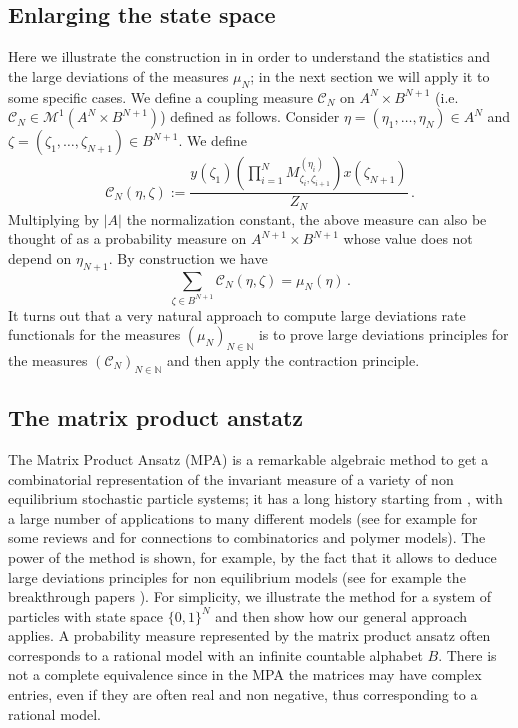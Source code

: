 \documentclass[reqno]{amsart}
\theoremstyle{plain}
\theoremstyle{definition}
\theoremstyle{remark}
\numberwithin{equation}{section}
\numberwithin{theorem}{section}
\newcommand{\<}{\langle}
\renewcommand{\>}{\rangle}
\begin{document}
	\subsection{Enlarging the state space}
	Here we illustrate the construction in \cite{GI1} in order to understand the statistics and the large deviations of the measures $\mu_N$; in the next section we will apply it to some specific cases. We define a coupling  measure $\mathcal C_N$ on $A^N\times {B}^{N+1}$ (i.e. $\mathcal C_N\in \mathcal M^1(A^N\times{B}^{N+1})$) defined as follows. Consider $\eta=(\eta_1,\dots ,\eta_N)\in A^N$ and $\zeta=(\zeta_1,\dots,\zeta_{N+1})\in {B}^{N+1}$. We define 
	\begin{equation}\label{ingrassata}
		\mathcal C_N(\eta,\zeta):=\frac{y(\zeta_1)\left(\prod_{i=1}^NM^{(\eta_i)}_{\zeta_i,\zeta_{i+1}}\right)x(\zeta_{N+1})}{Z_N}\,.
	\end{equation}
	Multiplying by $|A|$ the normalization constant, the above measure can also be thought of as a probability measure on $A^{N+1}\times {B}^{N+1}$ whose value does not depend on $\eta_{N+1}$. 
	By construction we have
	\begin{equation}
		\sum_{\zeta\in {B}^{N+1} }\mathcal C_N(\eta,\zeta)=\mu_N(\eta)\,.
	\end{equation}
	It turns out that a very natural approach to compute large deviations rate functionals for the measures $(\mu_N)_{N\in \mathbb N}$ is to prove large deviations principles for the measures $(\mathcal C_N)_{N\in \mathbb N}$ and then apply the contraction principle.
	
	
	\subsection{The matrix product anstatz}\label{sec:MPA}
	
	The Matrix Product Ansatz (MPA) is a remarkable algebraic method to get a combinatorial representation of the invariant measure of a variety of non equilibrium stochastic particle systems; it has a long history starting from \cite{Der1,Der2,Der3,Schutz}, with a large number of applications to many different models (see for example \cite{reviewhold,review} for some reviews and \cite{NS} for connections to combinatorics and polymer models). The power of the method is shown, for example, by the fact that it allows to deduce large deviations principles for non equilibrium models (see for example the breakthrough papers \cite{Der4,Der5,Derr6,Derr7,Enaud}). For simplicity, we illustrate the method for a system of particles with state space $\{0,1\}^N$ and then show how our general approach applies. A probability measure represented by the matrix product ansatz often corresponds to a rational model with an infinite countable alphabet $B$. There is not a complete equivalence since in the MPA the matrices
	may have complex entries, even if they are often real and non negative, thus corresponding to a rational model.
	
\end{document}

